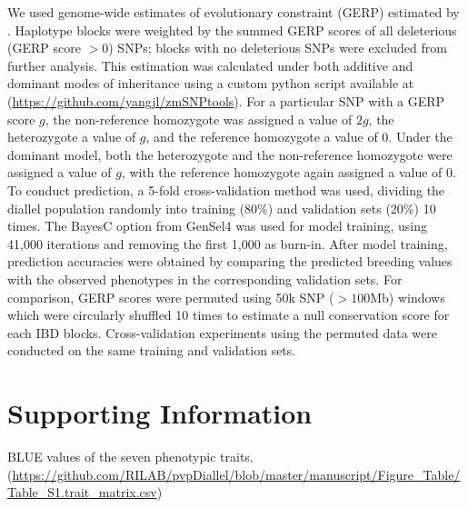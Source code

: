 \documentclass[twoside, twocolumn, letterpaper]{article}
\renewcommand{\baselinestretch}{1}
\newcommand{\beginsupplement}{%
        \setcounter{table}{0}
        \renewcommand{\tablename}{Supplementary Table}%
        \setcounter{figure}{0}
        \renewcommand{\figurename}{Supplementary Figure}%
}
\begin{document}
We used genome-wide estimates of evolutionary constraint (GERP) \citep{Davydov2010} estimated by \citep{rodgers2015recombination}. 
Haplotype blocks were weighted by the summed GERP scores of all deleterious (GERP score $>0$) SNPs; blocks with no deleterious SNPs were excluded from further analysis. 
This estimation was calculated under both additive and dominant modes of inheritance using a custom python script available at (\url{https://github.com/yangjl/zmSNPtools}). 
For a particular SNP with a GERP score $g$, the non-reference homozygote was assigned a value of $2g$, the heterozygote a value of $g$, and the reference homozygote a value of 0.  
Under the dominant model, both the heterozygote and the non-reference homozygote were assigned a value of $g$, with the reference homozygote again assigned a value of 0.
To conduct prediction, a 5-fold cross-validation method was used, dividing the diallel population  randomly  into training (80\%) and validation sets (20\%)  10 times. 
The BayesC option from GenSel4 \citep{habier2011extension} was used for model training, using 41,000 iterations and removing the first 1,000 as burn-in. 
After model training, prediction accuracies were obtained by comparing the predicted breeding values with the observed phenotypes in the corresponding validation sets. 
For comparison, GERP scores were permuted using 50k SNP ($> 100$Mb) windows which were circularly shuffled 10 times to estimate a null conservation score for each IBD blocks. 
Cross-validation experiments using the permuted data were conducted on the same training and validation sets.  


{\scriptsize \sf
\renewcommand{\baselinestretch}{2.0}


}



\onecolumn


\pagebreak
\beginsupplement

\section*{Supporting Information}

\begin{table}[]
\caption{BLUE values of the seven phenotypic traits. (\url{https://github.com/RILAB/pvpDiallel/blob/master/manuscript/Figure_Table/Table_S1.trait_matrix.csv})}
\label{table:table_s1}
\end{table}
\end{document}
